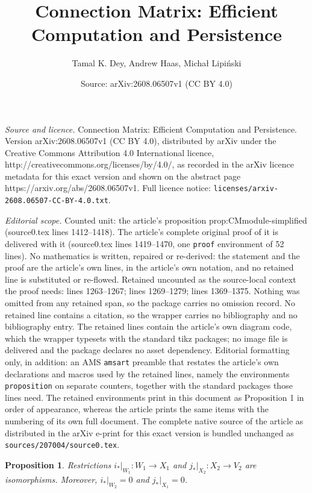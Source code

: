 \documentclass[10pt,a4paper]{amsart}
\title{Connection Matrix: Efficient Computation and Persistence}
\author{Tamal K. Dey, Andrew Haas, Micha\l{} Lipi\'nski}
\date{Source: arXiv:2608.06507v1 (CC BY 4.0)}
\newtheorem{proposition}{Proposition}
\begin{document}
\maketitle

\noindent\emph{Source and licence.} Connection Matrix: Efficient Computation and Persistence. Version arXiv:2608.06507v1 (CC BY 4.0), distributed by arXiv under the Creative Commons Attribution 4.0 International licence, http://creativecommons.org/licenses/by/4.0/, as recorded in the arXiv licence metadata for this exact version and shown on the abstract page https://arxiv.org/abs/2608.06507v1. Full licence notice: \texttt{licenses/arxiv-2608.06507-CC-BY-4.0.txt}.\par\smallskip

\noindent\textit{Editorial scope.} Counted unit: the article's proposition prop:CMmodule-simplified (source0.tex lines 1412--1418). The article's complete original proof of it is delivered with it (source0.tex lines 1419--1470, one \texttt{proof} environment of 52 lines). No mathematics is written, repaired or re-derived: the statement and the proof are the article's own lines, in the article's own notation, and no retained line is substituted or re-flowed.  Retained uncounted as the source-local context the proof needs: lines 1263--1267; lines 1269--1279; lines 1369--1375.  Nothing was omitted from any retained span, so the package carries no omission record.  No retained line contains a citation, so the wrapper carries no bibliography and no bibliography entry.  The retained lines contain the article's own diagram code, which the wrapper typesets with the standard tikz packages; no image file is delivered and the package declares no asset dependency.  Editorial formatting only, in addition: an AMS \texttt{amsart} preamble that restates the article's own declarations and macros used by the retained lines, namely the environments \texttt{proposition} on separate counters, together with the standard packages those lines need.  The retained environments print in this document as Proposition 1 in order of appearance, whereas the article prints the same items with the numbering of its own full document.  The complete native source of the article as distributed in the arXiv e-print for this exact version is bundled unchanged as \texttt{sources/207004/source0.tex}.
\begin{proposition}\label{prop:structure-of-i-j-ast}
    Restrictions $i_\ast|_{W_1}:W_1\rightarrow X_1$ and $j_\ast|_{X_2}:X_2\rightarrow V_2$ are isomorphisms.  
    Moreover, $i_\ast|_{W_2}=0$ and $j_\ast|_{X_1}=0$.
\end{proposition}
\end{document}
